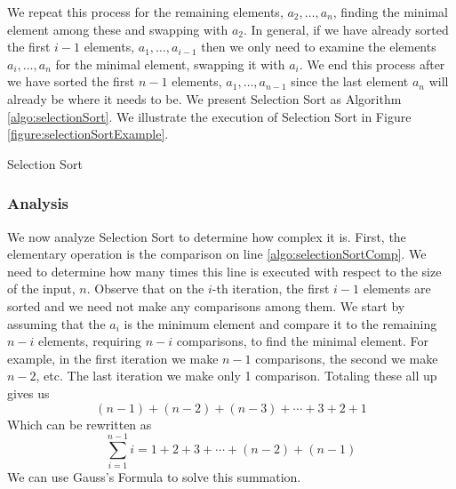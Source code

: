 We repeat this process for the remaining elements, $a_2, \ldots, a_n$, 
finding the minimal element among these and swapping with $a_2$.  In 
general, if we have already sorted the first $i-1$ elements, 
$a_1, \ldots, a_{i-1}$ then we only need to examine the elements
$a_i, \ldots, a_n$ for the minimal element, swapping it with $a_i$.
We end this process after we have sorted the first $n-1$ elements, 
$a_1, \ldots, a_{n-1}$ since the last element $a_n$ will already
be where it needs to be.  We present Selection Sort as Algorithm 
\ref{algo:selectionSort}.  We illustrate the execution of Selection 
Sort in Figure \ref{figure:selectionSortExample}. 

    \begin{algorithm}[H]
    \caption{Selection Sort}
    \label{algo:selectionSort}
    \end{algorithm}



\subsubsection{Analysis}

We now analyze Selection Sort to determine how complex it is.  First, the
elementary operation is the comparison on line \ref{algo:selectionSortComp}.
We need to determine how many times this line is executed with respect
to the size of the input, $n$.  Observe that on the $i$-th iteration, the first
$i-1$ elements are sorted and we need not make any comparisons among
them.  We start by assuming that the $a_i$ is the minimum element and
compare it to the remaining $n-i$ elements, requiring $n-i$ comparisons,
to find the minimal element.  For example, in the first iteration we
make $n-1$ comparisons, the second we make $n-2$, etc.  The last
iteration we make only 1 comparison.  Totaling these all up gives us
  $$(n-1) + (n-2) + (n-3) + \cdots + 3 + 2 + 1$$
Which can be rewritten as 
  $$\sum_{i=1}^{n-1} i = 1 + 2 + 3 + \cdots + (n-2) + (n-1)$$
We can use Gauss's Formula to solve this summation.


